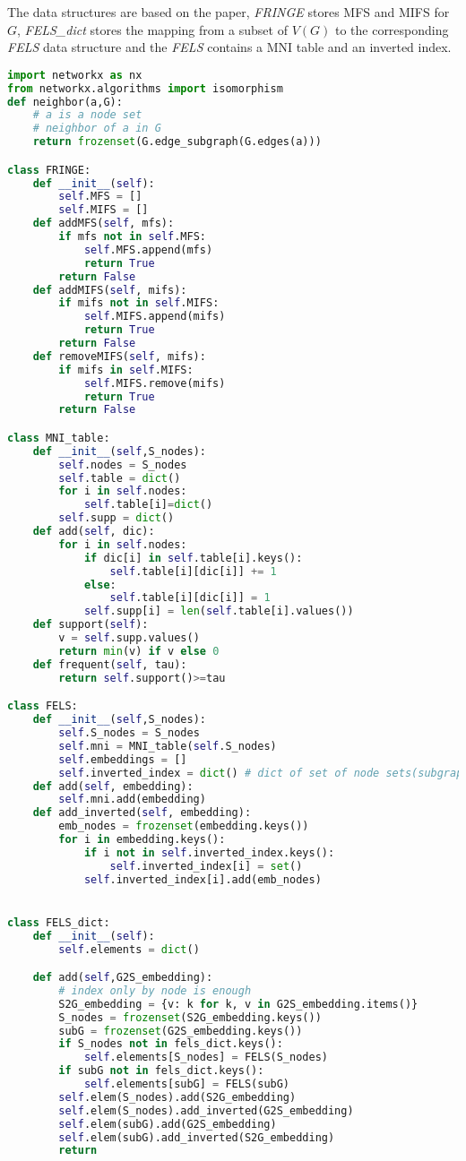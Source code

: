 \documentclass[a4paper, 12pt]{report}
\begin{document}
The data structures are based on the paper, \emph{FRINGE} stores MFS and MIFS for $G$, \emph{FELS\_dict} stores the mapping from a subset of $V(G)$ to the corresponding \emph{FELS} data structure and the \emph{FELS} contains a MNI table and an inverted index.
\begin{lstlisting}[language=python, frame=single]
import networkx as nx
from networkx.algorithms import isomorphism
def neighbor(a,G):
    # a is a node set
    # neighbor of a in G
    return frozenset(G.edge_subgraph(G.edges(a)))

class FRINGE:
    def __init__(self):
        self.MFS = []
        self.MIFS = []
    def addMFS(self, mfs):
        if mfs not in self.MFS:
            self.MFS.append(mfs)
            return True
        return False
    def addMIFS(self, mifs):
        if mifs not in self.MIFS:
            self.MIFS.append(mifs)
            return True
        return False
    def removeMIFS(self, mifs):
        if mifs in self.MIFS:
            self.MIFS.remove(mifs)
            return True
        return False

class MNI_table:
    def __init__(self,S_nodes):
        self.nodes = S_nodes
        self.table = dict()
        for i in self.nodes:
            self.table[i]=dict()
        self.supp = dict()
    def add(self, dic):
        for i in self.nodes:
            if dic[i] in self.table[i].keys():
                self.table[i][dic[i]] += 1
            else:
                self.table[i][dic[i]] = 1
            self.supp[i] = len(self.table[i].values())
    def support(self):
        v = self.supp.values()
        return min(v) if v else 0
    def frequent(self, tau):
        return self.support()>=tau

class FELS:
    def __init__(self,S_nodes):
        self.S_nodes = S_nodes
        self.mni = MNI_table(self.S_nodes)
        self.embeddings = []
        self.inverted_index = dict() # dict of set of node sets(subgraph)
    def add(self, embedding):
        self.mni.add(embedding)
    def add_inverted(self, embedding):
        emb_nodes = frozenset(embedding.keys())
        for i in embedding.keys():
            if i not in self.inverted_index.keys():
                self.inverted_index[i] = set()
            self.inverted_index[i].add(emb_nodes)


class FELS_dict:
    def __init__(self):
        self.elements = dict()

    def add(self,G2S_embedding):
        # index only by node is enough
        S2G_embedding = {v: k for k, v in G2S_embedding.items()}
        S_nodes = frozenset(S2G_embedding.keys())
        subG = frozenset(G2S_embedding.keys())
        if S_nodes not in fels_dict.keys():
            self.elements[S_nodes] = FELS(S_nodes)
        if subG not in fels_dict.keys():
            self.elements[subG] = FELS(subG)
        self.elem(S_nodes).add(S2G_embedding)
        self.elem(S_nodes).add_inverted(G2S_embedding)
        self.elem(subG).add(G2S_embedding)
        self.elem(subG).add_inverted(S2G_embedding)
        return


\end{lstlisting}
\end{document}
